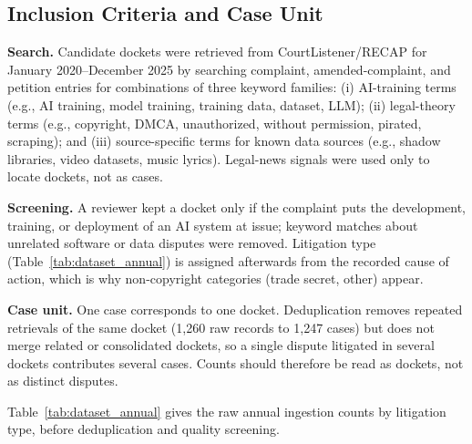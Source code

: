 \subsection{Inclusion Criteria and Case Unit}
\label{app:inclusion}

\textbf{Search.} Candidate dockets were retrieved from CourtListener/RECAP for January 2020--December 2025 by searching complaint, amended-complaint, and petition entries for combinations of three keyword families: (i) AI-training terms (e.g., AI training, model training, training data, dataset, LLM); (ii) legal-theory terms (e.g., copyright, DMCA, unauthorized, without permission, pirated, scraping); and (iii) source-specific terms for known data sources (e.g., shadow libraries, video datasets, music lyrics). Legal-news signals were used only to locate dockets, not as cases.

\textbf{Screening.} A reviewer kept a docket only if the complaint puts the development, training, or deployment of an AI system at issue; keyword matches about unrelated software or data disputes were removed. Litigation type (Table~\ref{tab:dataset_annual}) is assigned afterwards from the recorded cause of action, which is why non-copyright categories (trade secret, other) appear.

\textbf{Case unit.} One case corresponds to one docket. Deduplication removes repeated retrievals of the same docket (1{,}260 raw records to 1{,}247 cases) but does not merge related or consolidated dockets, so a single dispute litigated in several dockets contributes several cases. Counts should therefore be read as dockets, not as distinct disputes.

Table~\ref{tab:dataset_annual} gives the raw annual ingestion counts by litigation type, before deduplication and quality screening.

\begin{table}[h]
\centering
\caption{Annual filing breakdown by litigation type. Counts are raw ingested filings (1,260) before deduplication; the annotated subset contains 1,247 cases.}
\label{tab:dataset_annual}
\end{table}

